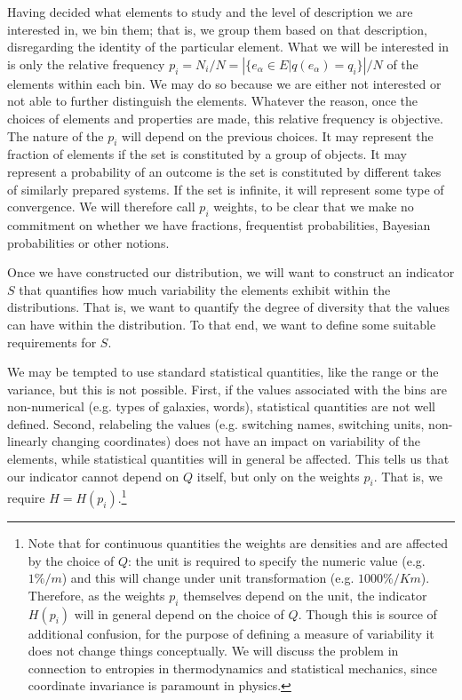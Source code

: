 \documentclass{article}
\begin{document}
Having decided what elements to study and the level of description we are interested in, we bin them; that is, we group them based on that description, disregarding the identity of the particular element. What we will be interested in is only the relative frequency $p_i = N_i / N = \left| \{e_\alpha \in E | q(e_\alpha) = q_i \} \right| / N$ of the elements within each bin. We may do so because we are either not interested or not able to further distinguish the elements. Whatever the reason, once the choices of elements and properties are made, this relative frequency is objective. The nature of the $p_i$ will depend on the previous choices. It may represent the fraction of elements if the set is constituted by a group of objects. It may represent a probability of an outcome is the set is constituted by different takes of similarly prepared systems. If the set is infinite, it will represent some type of convergence. We will therefore call $p_i$ weights, to be clear that we make no commitment on whether we have fractions, frequentist probabilities, Bayesian probabilities or other notions.

Once we have constructed our distribution, we will want to construct an indicator $S$ that quantifies how much variability the elements exhibit within the distributions. That is, we want to quantify the degree of diversity that the values can have within the distribution. To that end, we want to define some suitable requirements for $S$.

We may be tempted to use standard statistical quantities, like the range or the variance, but this is not possible. First, if the values associated with the bins are non-numerical (e.g. types of galaxies, words), statistical quantities are not well defined. Second, relabeling the values (e.g. switching names, switching units, non-linearly changing coordinates) does not have an impact on variability of the elements, while statistical quantities will in general be affected. This tells us that our indicator cannot depend on $Q$ itself, but only on the weights $p_i$. That is, we require $H=H(p_i)$.\footnote{Note that for continuous quantities the weights are densities and are affected by the choice of $Q$: the unit is required to specify the numeric value (e.g. $1 \% / m$) and this will change under unit transformation (e.g. $1000 \% / Km$). Therefore, as the weights $p_i$ themselves depend on the unit, the indicator $H(p_i)$ will in general depend on the choice of $Q$. Though this is source of additional confusion, for the purpose of defining a measure of variability it does not change things conceptually. We will discuss the problem in connection to entropies in thermodynamics and statistical mechanics, since coordinate invariance is paramount in physics.}
\end{document}
